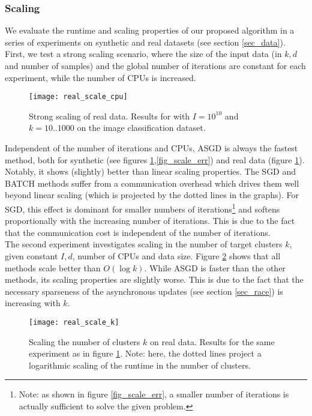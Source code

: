 \documentclass{acm_proc_article-sp}
\begin{document}
\subsubsection*{Scaling\label{sec_ex_scale}}
We evaluate the runtime and scaling properties of our proposed algorithm 
in a series of experiments on synthetic and real datasets (see section 
\ref{sec_data}). First, we test a strong scaling scenario, where the 
size of the input data (in $k,d$ and number of samples) and the 
global number of iterations are constant for each experiment, 
while the number of CPUs is increased.
\begin{figure}[!ht]
\texttt{[image: real\_scale\_cpu]}
\caption{Strong scaling of real data. Results for with $I=10^{10}$ 
and $k=10..1000$ on the image classification dataset.                                               
\label{fig_eval_real_scaling}}
\end{figure}
Independent of the number of iterations and CPUs, ASGD is always
the fastest method, both for synthetic (see figures \ref{fig_eval_real_scaling},\ref{fig_scale_err})
 and real data (figure \ref{fig_eval_real_scaling}).
Notably, it shows (slightly) better than linear
scaling properties. The SGD and BATCH methods suffer from a
communication overhead which drives them well beyond linear scaling
(which is projected by the dotted lines in the graphs). 
For SGD, this effect is dominant for
smaller numbers of iterations\footnote{Note: as shown in figure \ref{fig_scale_err},
a smaller number of iterations is actually sufficient to solve the given problem.} 
and softens proportionally with the increasing number of iterations. This is
due to the fact that the communication cost is independent of the number of 
iterations.\\
The second experiment investigates scaling in the number of target clusters
$k$, given constant $I,d$, number of CPUs and data size. Figure 
\ref{fig_eval_real_k} shows that all methods scale better than
$O(\log k)$. While ASGD is faster than the other methods, its scaling properties are
slightly worse. This is due to the fact that the necessary sparseness of
the asynchronous updates (see section \ref{sec_race}) is increasing with
$k$. 
\begin{figure}[!ht]
\texttt{[image: real\_scale\_k]}
\caption{Scaling the number of clusters $k$ on real data. Results
for the same experiment as in figure \ref{fig_eval_real_scaling}.
Note: here, the dotted lines project
a logarithmic scaling of the runtime in the number of clusters.
\label{fig_eval_real_k}}
\end{figure}
\newpage
\end{document}
